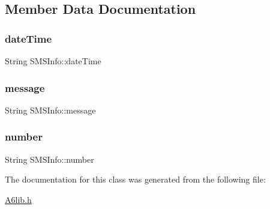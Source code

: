 \subsection{Member Data Documentation}
\mbox{\label{class_s_m_s_info_adad4d90acd6d7ab33904c929b7e629d6}} 
\subsubsection{\texorpdfstring{date\+Time}{dateTime}}
{\footnotesize\ttfamily String S\+M\+S\+Info\+::date\+Time}

\mbox{\label{class_s_m_s_info_aa6acfef8d31d0b57f04e3782faf550bb}} 
\subsubsection{\texorpdfstring{message}{message}}
{\footnotesize\ttfamily String S\+M\+S\+Info\+::message}

\mbox{\label{class_s_m_s_info_ad4574e2c51baaf47d01e738b6f2ecf41}} 
\subsubsection{\texorpdfstring{number}{number}}
{\footnotesize\ttfamily String S\+M\+S\+Info\+::number}



The documentation for this class was generated from the following file\+:\begin{DoxyCompactItemize}
\item 
\mbox{\hyperlink{_a6lib_8h}{A6lib.\+h}}\end{DoxyCompactItemize}
